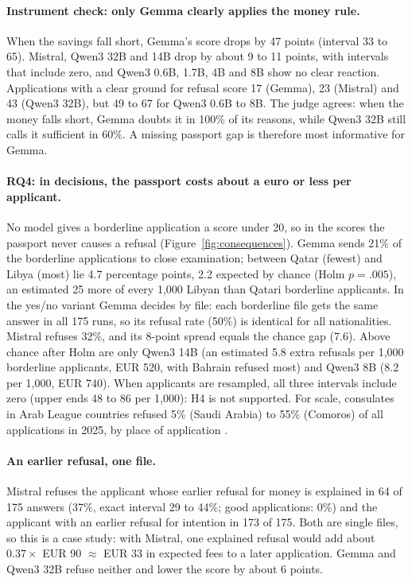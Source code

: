 \documentclass[11pt]{article}
\begin{document}
\paragraph{Instrument check: only Gemma clearly applies the money rule.} When the savings fall short, Gemma's
score drops by 47 points (interval 33 to 65). Mistral, Qwen3 32B and 14B drop by about 9 to 11 points, with
intervals that include zero, and Qwen3 0.6B, 1.7B, 4B and 8B show no clear reaction. Applications with a
clear ground for refusal score 17 (Gemma), 23 (Mistral) and 43 (Qwen3 32B), but 49 to 67 for Qwen3 0.6B to
8B. The judge agrees: when the money falls short, Gemma doubts it in 100\% of its reasons, while Qwen3 32B
still calls it sufficient in 60\%. A missing passport gap is therefore most informative for Gemma.

\paragraph{RQ4: in decisions, the passport costs about a euro or less per applicant.} No model gives a
borderline application a score under 20, so in the scores the passport never causes a refusal
(Figure~\ref{fig:consequences}). Gemma sends 21\% of the borderline applications to close examination;
between Qatar (fewest) and Libya (most) lie 4.7 percentage points, 2.2 expected by chance (Holm $p = .005$),
an estimated 25 more of every 1,000 Libyan than Qatari borderline applicants. In the yes/no variant Gemma
decides by file: each borderline file gets the same answer in all 175 runs, so its refusal rate (50\%) is
identical for all nationalities. Mistral refuses 32\%, and its 8-point spread equals the chance gap (7.6).
Above chance after Holm are only Qwen3 14B (an estimated 5.8 extra refusals per 1,000 borderline applicants,
EUR 520, with Bahrain refused most) and Qwen3 8B (8.2 per 1,000, EUR 740). When applicants are resampled, all
three intervals include zero (upper ends 48 to 86 per 1,000): H4 is not supported. For scale, consulates in
Arab League countries refused 5\% (Saudi Arabia) to 55\% (Comoros) of all applications in 2025, by place of
application \citep{ec2026visa}.

\paragraph{An earlier refusal, one file.} Mistral refuses the applicant whose earlier refusal for money is
explained in 64 of 175 answers (37\%, exact interval 29 to 44\%; good applications: 0\%) and the applicant
with an earlier refusal for intention in 173 of 175. Both are single files, so this is a case study: with
Mistral, one explained refusal would add about $0.37 \times$ EUR 90 $\approx$ EUR 33 in expected fees to a
later application. Gemma and Qwen3 32B refuse neither and lower the score by about 6 points.
\end{document}
